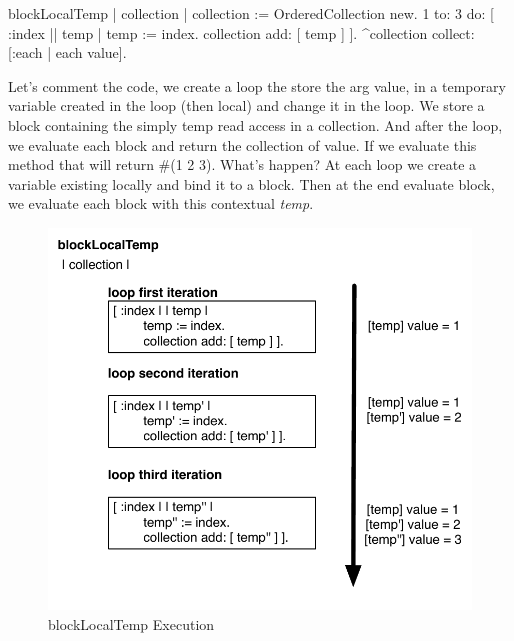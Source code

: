 \documentclass[a4paper,10pt,twoside]{book}
\begin{document}
\begin{code}{}
blockLocalTemp
	| collection |
		collection := OrderedCollection new.
		1 to: 3 do: [ :index || temp |
			temp := index.
			collection add: [ temp ] ].
		^collection collect: [:each | each value].
\end{code}

Let's comment the code, we create a loop the store the arg value, in a temporary variable created in the loop (then local) and change it in the loop. We store a block containing the simply temp read access in a collection. And after the loop, we evaluate each block and return the collection of value.
If we evaluate this method that will return \#(1 2 3). What's happen? At each loop we create a variable existing locally and bind it to a block. Then at the end evaluate block, we evaluate each block with this contextual \emph{temp}.

\begin{figure}[htbp]
	\centering
        \includegraphics[width=0.7\linewidth]{blockClosureLocalTemp}
	\caption{blockLocalTemp Execution}
	\label{fig:blockLocalTempExecution}
\end{figure}
\end{document}
